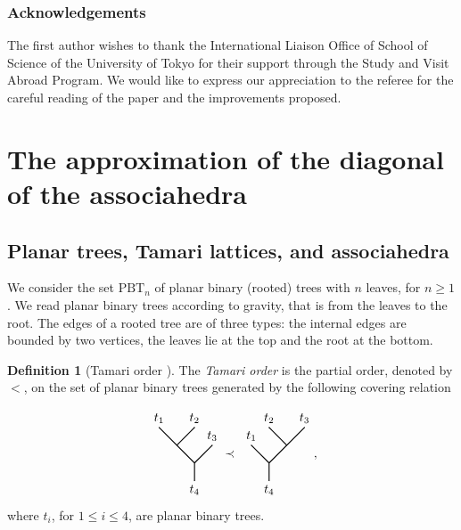 \documentclass[11pt]{article}
\numberwithin{equation}{section}\providecommand{\No}{}
\theoremstyle{plain}
\theoremstyle{definition}
\newtheorem{definition}{Definition}
\newcommand{\Tam}[1]{\mathrm{PBT}_{#1}}
\begin{document}
\subsubsection*{Acknowledgements} The first author wishes to thank the International Liaison Office of School of Science of the University of Tokyo for their support through the Study and Visit Abroad Program. We would like to express our appreciation to the referee for the careful reading of the paper and the improvements proposed.

\section{The approximation of the diagonal of the associahedra}
\subsection{Planar trees, Tamari lattices, and associahedra}

We consider the set $\Tam{n}$ of planar binary (rooted) trees with $n$ leaves, for $n\geq 1$. We read planar binary trees according to gravity, that is from the leaves to the root. The edges of a rooted tree are of three types: the internal edges are bounded by two vertices, the leaves lie at the top and the root at the bottom.

\begin{definition}[Tamari order \cite{Tamari51}]
The \emph{Tamari order} is the partial order, denoted by $<$, on the set of planar binary trees generated by the following covering relation

\[{\vcenter{\hbox{
\begin{tikzpicture}[yscale=0.5,xscale=0.5]
\draw[thick] (0,-1)--(0,0) -- (-2,2);
\draw[thick] (-1,1)--(0,2) ;
\draw[thick] (0,0)--(1,1) ;
\draw [fill] (0,-1) circle [radius=0.014];
\draw [fill] (-2,2) circle [radius=0.014];
\draw [fill] (1,1) circle [radius=0.014];
\draw [fill] (0,2) circle [radius=0.014];

\draw (-2,2) node[above] {$t_1$};
\draw (0,2) node[above] {$t_2$};
\draw (1,1) node[above] {$t_3$};
\draw (0,-1) node[below] {$t_4$};
\end{tikzpicture}}}}
\prec
{\vcenter{\hbox{
\begin{tikzpicture}[yscale=0.5,xscale=0.5]
\draw[thick] (0,-1)--(0,0) -- (2,2);
\draw[thick] (1,1)--(0,2) ;
\draw[thick] (0,0)--(-1,1) ;
\draw [fill] (0,-1) circle [radius=0.014];
\draw [fill] (2,2) circle [radius=0.014];
\draw [fill] (-1,1) circle [radius=0.014];
\draw [fill] (0,2) circle [radius=0.014];

\draw (2,2) node[above] {$t_3$};
\draw (0,2) node[above] {$t_2$};
\draw (-1,1) node[above] {$t_1$};
\draw (0,-1) node[below] {$t_4$};
\end{tikzpicture}}}},
\]
where $t_i$, for $1\leq i\leq 4$, are planar binary trees.
\end{definition}
\end{document}
